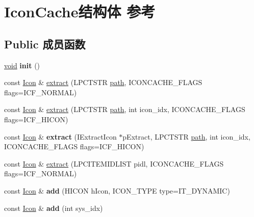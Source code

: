 \hypertarget{struct_icon_cache}{}\section{Icon\+Cache结构体 参考}
\label{struct_icon_cache}
\subsection*{Public 成员函数}
\begin{DoxyCompactItemize}
\item 
\mbox{\label{struct_icon_cache_a368d610487d5dab6396ca860d77c7aa2}} 
\hyperlink{interfacevoid}{void} {\bfseries init} ()
\item 
const \hyperlink{struct_icon}{Icon} \& \hyperlink{struct_icon_cache_aa765b3e3ca0eea6f221fa25ad6c11c7c}{extract} (L\+P\+C\+T\+S\+TR \hyperlink{structpath}{path}, I\+C\+O\+N\+C\+A\+C\+H\+E\+\_\+\+F\+L\+A\+GS flags=I\+C\+F\+\_\+\+N\+O\+R\+M\+AL)
\item 
const \hyperlink{struct_icon}{Icon} \& \hyperlink{struct_icon_cache_a62b18f8a6dc71ed7632c22879728f472}{extract} (L\+P\+C\+T\+S\+TR \hyperlink{structpath}{path}, int icon\+\_\+idx, I\+C\+O\+N\+C\+A\+C\+H\+E\+\_\+\+F\+L\+A\+GS flags=I\+C\+F\+\_\+\+H\+I\+C\+ON)
\item 
\mbox{\label{struct_icon_cache_a443f93225214f5b73cd0943ae8fd1622}} 
const \hyperlink{struct_icon}{Icon} \& {\bfseries extract} (I\+Extract\+Icon $\ast$p\+Extract, L\+P\+C\+T\+S\+TR \hyperlink{structpath}{path}, int icon\+\_\+idx, I\+C\+O\+N\+C\+A\+C\+H\+E\+\_\+\+F\+L\+A\+GS flags=I\+C\+F\+\_\+\+H\+I\+C\+ON)
\item 
const \hyperlink{struct_icon}{Icon} \& \hyperlink{struct_icon_cache_a0f47a9cd0630185ccef96fddcdb40083}{extract} (L\+P\+C\+I\+T\+E\+M\+I\+D\+L\+I\+ST pidl, I\+C\+O\+N\+C\+A\+C\+H\+E\+\_\+\+F\+L\+A\+GS flags=I\+C\+F\+\_\+\+N\+O\+R\+M\+AL)
\item 
\mbox{\label{struct_icon_cache_a8bbcc8db8286c3798280338a775da425}} 
const \hyperlink{struct_icon}{Icon} \& {\bfseries add} (H\+I\+C\+ON h\+Icon, I\+C\+O\+N\+\_\+\+T\+Y\+PE type=I\+T\+\_\+\+D\+Y\+N\+A\+M\+IC)
\item 
\mbox{\label{struct_icon_cache_ad07f72508a0d560a50f063f2d24c4020}} 
const \hyperlink{struct_icon}{Icon} \& {\bfseries add} (int sys\+\_\+idx)

\end{DoxyCompactItemize}

